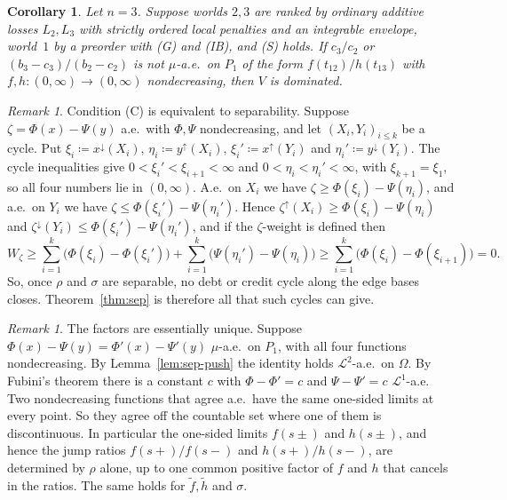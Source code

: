 \documentclass[11pt]{article}
\newtheorem{corollary}[theorem]{Corollary}
\theoremstyle{definition}\newtheorem{definition}[theorem]{Definition}
\theoremstyle{remark}\newtheorem{remark}[theorem]{Remark}
\begin{document}
\begin{corollary}\label{cor:sep}
Let $n=3$. Suppose worlds $2,3$ are ranked by ordinary additive losses $L_2,L_3$
with strictly ordered local penalties and an integrable envelope, world~$1$
by a preorder with (G) and (IB), and (S) holds. If $c_3/c_2$ or
$(b_3-c_3)/(b_2-c_2)$ is not $\mu$-a.e.\ on $P_1$ of the form
$f(t_{12})/h(t_{13})$ with $f,h\colon(0,\infty)\to(0,\infty)$
nondecreasing, then $V$ is dominated.
\end{corollary}

\begin{remark}\label{rem:sep-converse}
Condition (C) is equivalent to separability. Suppose $\zeta=\Phi(x)-\Psi(y)$
a.e.\ with $\Phi,\Psi$ nondecreasing, and let $(X_i,Y_i)_{i\le k}$ be a cycle.
Put $\xi_i\coloneqq x^{\downarrow}(X_i)$, $\eta_i\coloneqq y^{\uparrow}(X_i)$,
$\xi_i'\coloneqq x^{\uparrow}(Y_i)$ and $\eta_i'\coloneqq y^{\downarrow}(Y_i)$.
The cycle inequalities give $0<\xi_i'<\xi_{i+1}<\infty$ and
$0<\eta_i<\eta_i'<\infty$, with $\xi_{k+1}=\xi_1$, so all four numbers lie in
$(0,\infty)$. A.e.\ on $X_i$ we have $\zeta\ge\Phi(\xi_i)-\Psi(\eta_i)$, and
a.e.\ on $Y_i$ we have $\zeta\le\Phi(\xi_i')-\Psi(\eta_i')$. Hence
$\zeta^{\uparrow}(X_i)\ge\Phi(\xi_i)-\Psi(\eta_i)$ and
$\zeta^{\downarrow}(Y_i)\le\Phi(\xi_i')-\Psi(\eta_i')$, and if the
$\zeta$-weight is defined then
\[
 W_\zeta\ge\sum_{i=1}^k\bigl(\Phi(\xi_i)-\Phi(\xi_i')\bigr)
 +\sum_{i=1}^k\bigl(\Psi(\eta_i')-\Psi(\eta_i)\bigr)
 \ge\sum_{i=1}^k\bigl(\Phi(\xi_i)-\Phi(\xi_{i+1})\bigr)=0 .
\]
So, once $\rho$ and $\sigma$ are separable, no debt or credit cycle along
the edge bases closes. Theorem~\ref{thm:sep} is therefore all that such
cycles can give.
\end{remark}

\begin{remark}\label{rem:sep-unique}
The factors are essentially unique. Suppose
$\Phi(x)-\Psi(y)=\Phi'(x)-\Psi'(y)$ $\mu$-a.e.\ on $P_1$, with all four
functions nondecreasing. By Lemma~\ref{lem:sep-push} the identity holds
$\mathcal L^2$-a.e.\ on $\Omega$. By Fubini's theorem there is a constant
$c$ with $\Phi-\Phi'=c$ and $\Psi-\Psi'=c$ $\mathcal L^1$-a.e. Two
nondecreasing functions that agree a.e.\ have the same one-sided limits at
every point. So they agree off the countable set where one of them is
discontinuous. In particular the one-sided limits $f(s\pm)$ and $h(s\pm)$,
and hence the jump ratios $f(s+)/f(s-)$ and $h(s+)/h(s-)$, are determined by
$\rho$ alone, up to one common positive factor of $f$ and $h$ that cancels in
the ratios. The same holds for $\tilde f,\tilde h$ and $\sigma$.
\end{remark}
\end{document}
